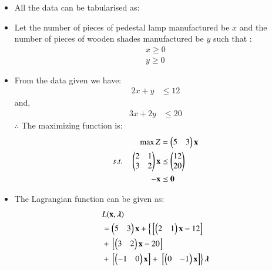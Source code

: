 \begin{itemize}
\item All the data can be tabularised as:

\begin{table}[!ht]
\centering
{}
\caption{Time needed and Profit for each object}
\label{opt/17/tab:table1}
\end{table}
\item Let the number of pieces of pedestal lamp manufactured be $x$ and
the number of pieces of wooden shades manufactured be $y$ such that : 
\begin{align}
    x \geq 0 
    \\
    y \geq 0 
\end{align}
\item From the data given we have:
\begin{align}
    2x+y &\leq 12 
\end{align}
and,
\begin{align}
    3x+2y &\leq  20
\end{align}
$\therefore$ The maximizing function is:
\begin{align}
        \max Z &= \begin{pmatrix}5& 3\end{pmatrix}\mathbf{x}\\
        s.t. \quad 
        \begin{pmatrix}2 & 1\\ 3 & 2 \end{pmatrix}\mathbf{x} &\preceq \begin{pmatrix}12\\20\end{pmatrix} \\
        \mathbf{-x} &\preceq \mathbf{0}
\end{align}
\item The Lagrangian function can be given as:
\begin{equation}
\begin{aligned}
    &L(\vec{x},\boldsymbol{\lambda}) \\ &= \myvec{5 & 3}\vec{x}+\lcbrak{\sbrak{\myvec{2 & 1}\vec{x}-12}} \\ &+ \sbrak{\myvec{3 & 2}\vec{x}-20} \\ &+ \sbrak{\myvec{-1 & 0}\vec{x}} +\rcbrak{\sbrak{\myvec{0 & -1}\vec{x}}}\boldsymbol{\lambda}
\end{aligned}

\end{equation}
\end{itemize}
